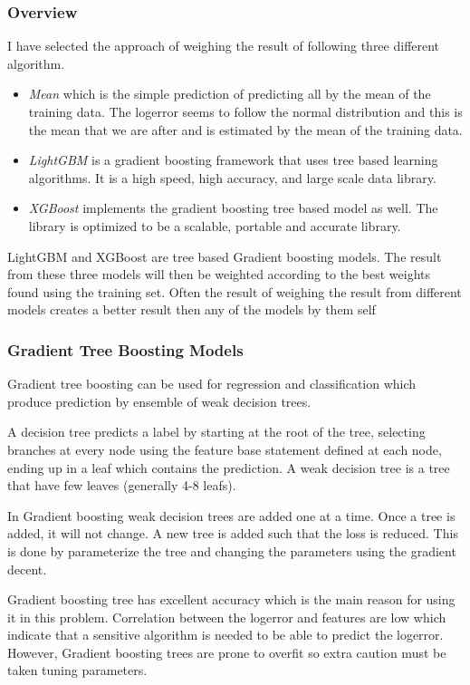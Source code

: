 \documentclass[a4paper]{article}
\begin{document}
\subsubsection{Overview}
I have selected the approach of weighing the result of following three different algorithm.
\begin{itemize}
    \item
        \textit{Mean} which is the simple prediction of predicting all by the mean of the training data. The logerror seems to follow the normal distribution and this is the mean that we are after and is estimated by the mean of the training data.
    \item
        \textit{LightGBM} is a gradient boosting framework that uses tree based learning algorithms. It is a high speed, high accuracy, and large scale data library.
    \item
        \textit{XGBoost} implements the gradient boosting tree based model as well. The library is optimized to be a scalable, portable and accurate library.
\end{itemize}
LightGBM and XGBoost are tree based Gradient boosting models. The result from these three models will then be weighted according to the best weights found using the training set. Often the result of weighing the result from different models creates a better result then any of the models by them self

\subsubsection{Gradient Tree Boosting Models}
Gradient tree boosting can be used for regression and classification which produce prediction by ensemble of weak decision trees.

A decision tree predicts a label by starting at the root of the tree, selecting branches at every node using the feature base statement defined at each node, ending up in a leaf which contains the prediction. A weak decision tree is a tree that have few leaves (generally 4-8 leafs).

In Gradient boosting weak decision trees are added one at a time. Once a tree is added, it will not change. A new tree is added such that the loss is reduced. This is done by parameterize the tree and changing the parameters using the gradient decent.

Gradient boosting tree has excellent accuracy which is the main reason for using it in this problem. Correlation between the logerror and features are low which indicate that a sensitive algorithm is needed to be able to predict the logerror. However, Gradient boosting trees are prone to overfit so extra caution must be taken tuning parameters.
\end{document}
